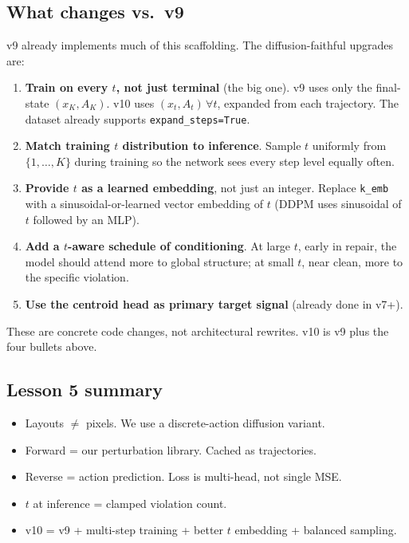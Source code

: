 \documentclass[11pt,a4paper]{article}
\begin{document}
\subsection{What changes vs.\ v9}

v9 already implements much of this scaffolding. The diffusion-faithful
upgrades are:

\begin{enumerate}[leftmargin=*]
\item \textbf{Train on every $t$, not just terminal} (the big one). v9
  uses only the final-state $(x_K, A_K)$. v10 uses
  $(x_t, A_t)\,\forall t$, expanded from each trajectory. The dataset
  already supports \verb|expand_steps=True|.

\item \textbf{Match training $t$ distribution to inference}. Sample $t$
  uniformly from $\{1, \ldots, K\}$ during training so the network sees
  every step level equally often.

\item \textbf{Provide $t$ as a learned embedding}, not just an integer.
  Replace \verb|k_emb| with a sinusoidal-or-learned vector embedding of $t$
  (DDPM uses sinusoidal of $t$ followed by an MLP).

\item \textbf{Add a $t$-aware schedule of conditioning}. At large $t$,
  early in repair, the model should attend more to global structure;
  at small $t$, near clean, more to the specific violation.

\item \textbf{Use the centroid head as primary target signal} (already
  done in v7+).
\end{enumerate}

These are concrete code changes, not architectural rewrites. v10 is
v9 plus the four bullets above.

\subsection{Lesson 5 summary}

\begin{itemize}[leftmargin=*]
\item Layouts $\neq$ pixels. We use a discrete-action diffusion variant.
\item Forward = our perturbation library. Cached as trajectories.
\item Reverse = action prediction. Loss is multi-head, not single MSE.
\item $t$ at inference = clamped violation count.
\item v10 = v9 + multi-step training + better $t$ embedding + balanced sampling.
\end{itemize}
\end{document}
